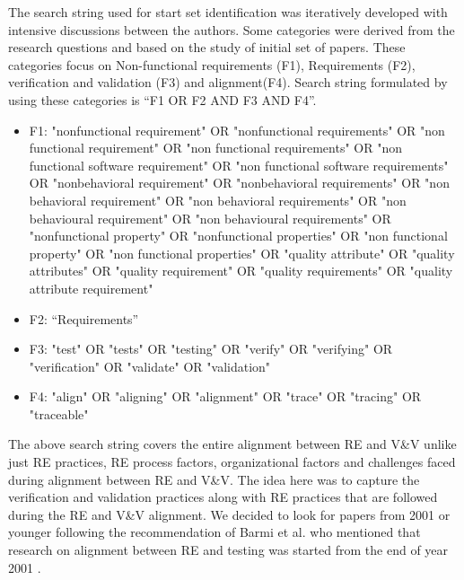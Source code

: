 \documentclass{article}
\begin{document}
The search string used for start set identification was iteratively developed with intensive discussions between the authors. Some categories were derived from the research questions and based on the study of initial set of papers.  These categories focus on Non-functional requirements (F1), Requirements (F2), verification and validation (F3) and alignment(F4). Search string formulated by using these categories is “F1 OR F2 AND F3 AND F4”. 
\begin{itemize}
    \item  F1: "nonfunctional requirement" OR "nonfunctional requirements" OR "non functional requirement" OR "non functional requirements" OR "non functional software requirement" OR "non functional software requirements" OR "nonbehavioral requirement" OR "nonbehavioral requirements" OR "non behavioral requirement" OR "non behavioral requirements" OR "non behavioural requirement" OR "non behavioural requirements" OR "nonfunctional property" OR "nonfunctional properties" OR "non functional property" OR "non functional properties" OR "quality attribute" OR "quality attributes" OR "quality requirement" OR "quality requirements" OR "quality attribute requirement"
    \item F2: “Requirements” 
    \item F3: "test" OR "tests" OR "testing" OR "verify" OR "verifying" OR "verification" OR "validate" OR "validation"
    \item F4: "align" OR "aligning" OR "alignment" OR "trace" OR "tracing" OR "traceable" 
\end{itemize}





The above search string covers the entire alignment between RE and V\&V unlike just RE practices, RE process factors, organizational factors and challenges faced during alignment between RE and V\&V. The idea here was to capture the verification and validation practices along with RE practices that are followed during the RE and V\&V alignment. We decided to look for papers from 2001 or younger following the recommendation of Barmi et al. who mentioned that research on alignment between RE and testing was started from the end of year 2001 \cite{barmi2011alignment}.
\end{document}

